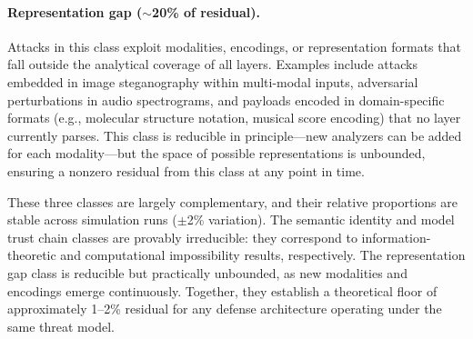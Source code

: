 \paragraph{Representation gap ($\sim$20\% of residual).} Attacks in this class exploit modalities, encodings, or representation formats that fall outside the analytical coverage of all layers. Examples include attacks embedded in image steganography within multi-modal inputs, adversarial perturbations in audio spectrograms, and payloads encoded in domain-specific formats (e.g., molecular structure notation, musical score encoding) that no layer currently parses. This class is reducible in principle---new analyzers can be added for each modality---but the space of possible representations is unbounded, ensuring a nonzero residual from this class at any point in time.

These three classes are largely complementary, and their relative proportions are stable across simulation runs ($\pm$2\% variation). The semantic identity and model trust chain classes are provably irreducible: they correspond to information-theoretic and computational impossibility results, respectively. The representation gap class is reducible but practically unbounded, as new modalities and encodings emerge continuously. Together, they establish a theoretical floor of approximately 1--2\% residual for any defense architecture operating under the same threat model.
